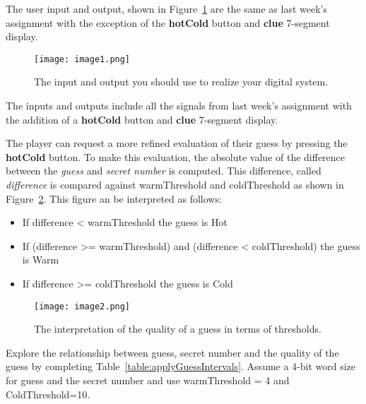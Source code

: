 The user input and output, shown in Figure~\ref{fig:iOonDevBorad} are the same as last week's
assignment with the exception of the \textbf{hotCold} button and
\textbf{clue} 7-segment display.

\begin{figure}[ht]
\texttt{[image:  image1.png]}
\caption{The input and output you should use to realize your digital system.}
\label{fig:iOonDevBorad}
\end{figure}

The inputs and outputs include all the signals from last week's assignment
with the addition of a \textbf{hotCold} button and \textbf{clue} 7-segment
display.

The player can request a more refined evaluation of their guess by
pressing the \textbf{hotCold} button. To make this evaluation, the
absolute value of the difference between the \emph{guess} and
\emph{secret number} is computed.  This difference, called 
\emph{difference} is compared against warmThreshold
and coldThreshold as shown in Figure~\ref{fig:guessThreshold}.
This figure an be interpreted as follows:

\begin{itemize}
\item
  If difference \textless{} warmThreshold the guess is Hot
\item
  If (difference \textgreater= warmThreshold) and (difference
  \textless{} coldThreshold) the guess is Warm
\item
  If difference \textgreater= coldThreshold the guess is Cold
\end{itemize}

\begin{figure}[ht]
\texttt{[image:  image2.png]}
\caption{The interpretation of the quality of a guess in terms of thresholds.}
\label{fig:guessThreshold}
\end{figure}

 Explore the relationship
between guess, secret number and the quality of the guess by completing
Table~\ref{table:applyGuessIntervals}. Assume a 4-bit word size for guess 
and the secret number and use warmThreshold = 4 and ColdThreshold=10.

